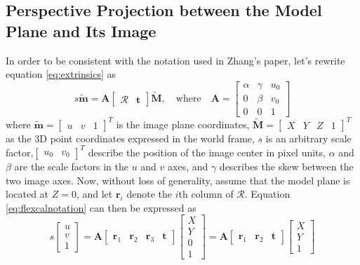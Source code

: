 \subsection{Perspective Projection between the Model Plane and Its Image}
In order to be consistent with the notation used in Zhang's paper, let's rewrite equation \ref{eq:extrinsics} as
\begin{equation}
\label{eq:flexcalnotation}
    s\tilde{\mathbf{m}}=\mathbf{A}\begin{bmatrix}\mathcal{R} & \mathbf{t}\end{bmatrix}\tilde{\mathbf{M}}, \quad \text{where}\quad\mathbf{A}=\begin{bmatrix} \alpha & \gamma & u_0 \\ 0 & \beta & v_0\\0 & 0 & 1\end{bmatrix}
\end{equation}
where $\tilde{\mathbf{m}}=\begin{bmatrix}u &v&1\end{bmatrix}^T$ is the image plane coordinates, $\tilde{\mathbf{M}}=\begin{bmatrix}X & Y & Z & 1\end{bmatrix}^T$ as the 3D point coordinates expressed in the world frame, $s$ is an arbitrary scale factor,$\begin{bmatrix}u_0 & v_0\end{bmatrix}^T$ describe the position of the image center in pixel units, $\alpha$ and $\beta$ are the scale factors in the $u$ and $v$ axes, and $\gamma$ describes the skew between the two image axes. Now, without loss of generality, assume that the model plane is located at $Z=0$, and let $\mathbf{r}_i$ denote the $i$th column of $\mathcal{R}$. Equation \ref{eq:flexcalnotation} can then be expressed as
\begin{equation}
    s\begin{bmatrix}u\\v\\1\end{bmatrix}=\mathbf{A}\begin{bmatrix}\mathbf{r}_1 & \mathbf{r}_2 & \mathbf{r}_3 & \mathbf{t}\end{bmatrix}\begin{bmatrix}X\\Y\\0\\1\end{bmatrix} =\mathbf{A}\begin{bmatrix}\mathbf{r}_1 & \mathbf{r}_2 & \mathbf{t}\end{bmatrix}\begin{bmatrix}X\\Y\\1\end{bmatrix}
\end{equation}
